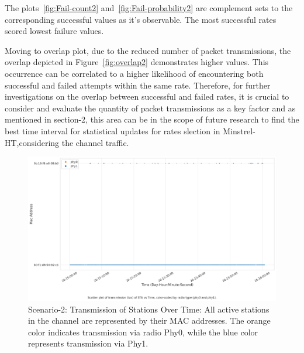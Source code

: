 The plots~\ref{fig:Fail-count2} and~\ref{fig:Fail-probability2} are complement sets to the corresponding successful values as it's observable. The most successful rates scored lowest failure values.

Moving to overlap plot, due to the reduced number of packet transmissions, the overlap depicted in Figure~\ref{fig:overlap2} demonstrates higher values. This occurrence can be correlated to a higher likelihood of encountering both successful and failed attempts within the same rate. Therefore, for further investigations on the overlap between successful and failed rates, it is crucial to consider and evaluate the quantity of packet transmissions as a key factor and as mentioned in section-2, this area can be in the scope of future research to find the best time interval for statistical updates for rates slection in Minstrel-HT,considering the channel traffic.



\begin{landscape}
\begin{figure}[hbt!]
  \centering
  \includegraphics[width=1.45\textwidth, height=\textheight, keepaspectratio]{figures/plots/Scenario-2/G2-22.png}
  \caption[Transmission of stations Over Time]{Scenario-2: Transmission of Stations Over Time: All active stations in the channel are represented by their MAC addresses. The orange color indicates transmission via radio Phy0, while the blue color represents transmission via Phy1.}
  \label{fig:populationmap-2}
\end{figure}
\FloatBarrier 
\end{landscape}

